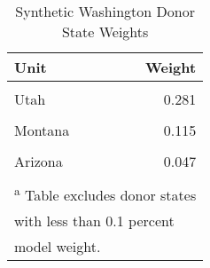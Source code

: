\begin{table}[H]

\caption{\label{tab:unit_weight_table_washington}Synthetic Washington Donor State Weights}
\centering
\begin{tabular}[t]{lr}
\toprule
Unit & Weight\\
\midrule
\cellcolor{gray!6}{Florida} & \cellcolor{gray!6}{0.282}\\
Utah & 0.281\\
\cellcolor{gray!6}{Connecticut} & \cellcolor{gray!6}{0.212}\\
Montana & 0.115\\
\cellcolor{gray!6}{Hawaii} & \cellcolor{gray!6}{0.048}\\
\addlinespace
Arizona & 0.047\\
\cellcolor{gray!6}{District of Columbia} & \cellcolor{gray!6}{0.015}\\
\bottomrule
\multicolumn{2}{l}{\textsuperscript{a} Table excludes donor states}\\
\multicolumn{2}{l}{with less than 0.1 percent}\\
\multicolumn{2}{l}{model weight.}\\
\end{tabular}
\end{table}
